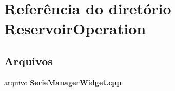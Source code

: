 \section{Referência do diretório Reservoir\+Operation}
\label{dir_0332f86f7e880bd9c812cb31ea7ae261}
\subsection*{Arquivos}
\begin{DoxyCompactItemize}
\item 
arquivo {\bf Serie\+Manager\+Widget.\+cpp}
\end{DoxyCompactItemize}
